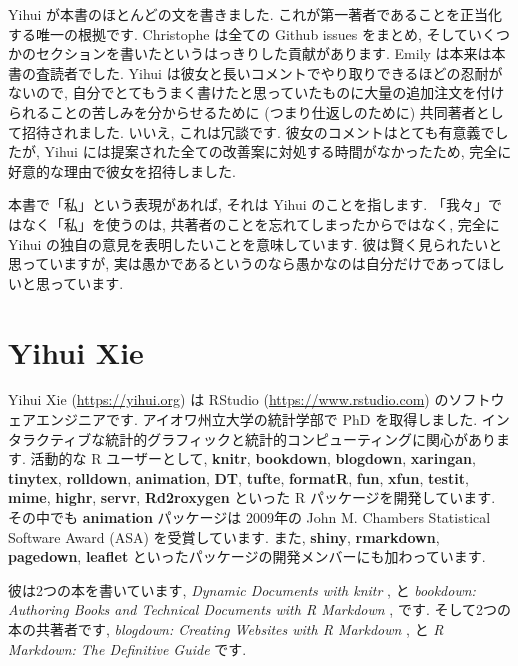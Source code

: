 \documentclass[
  11pt,
]{bxjsreport}
\begin{document}
Yihui が本書のほとんどの文を書きました. これが第一著者であることを正当化する唯一の根拠です. Christophe は全ての Github issues をまとめ, そしていくつかのセクションを書いたというはっきりした貢献があります. Emily は本来は本書の査読者でした. Yihui は彼女と長いコメントでやり取りできるほどの忍耐がないので, 自分でとてもうまく書けたと思っていたものに大量の追加注文を付けられることの苦しみを分からせるために (つまり仕返しのために) 共同著者として招待されました. いいえ, これは冗談です. 彼女のコメントはとても有意義でしたが, Yihui には提案された全ての改善案に対処する時間がなかったため, 完全に好意的な理由で彼女を招待しました.

本書で「私」という表現があれば, それは Yihui のことを指します. 「我々」ではなく「私」を使うのは, 共著者のことを忘れてしまったからではなく, 完全に Yihui の独自の意見を表明したいことを意味しています. 彼は賢く見られたいと思っていますが, 実は愚かであるというのなら愚かなのは自分だけであってほしいと思っています.

\hypertarget{yihui-xie}{%
\section*{Yihui Xie}\label{yihui-xie}}

Yihui Xie (\url{https://yihui.org}) は RStudio (\url{https://www.rstudio.com}) のソフトウェアエンジニアです. アイオワ州立大学の統計学部で PhD を取得しました. インタラクティブな統計的グラフィックと統計的コンピューティングに関心があります. 活動的な R ユーザーとして, \textbf{knitr}, \textbf{bookdown}, \textbf{blogdown}, \textbf{xaringan}, \textbf{tinytex}, \textbf{rolldown}, \textbf{animation}, \textbf{DT}, \textbf{tufte}, \textbf{formatR}, \textbf{fun}, \textbf{xfun}, \textbf{testit}, \textbf{mime}, \textbf{highr}, \textbf{servr}, \textbf{Rd2roxygen} といった R パッケージを開発しています. その中でも \textbf{animation} パッケージは 2009年の John M. Chambers Statistical Software Award (ASA) を受賞しています. また, \textbf{shiny}, \textbf{rmarkdown}, \textbf{pagedown}, \textbf{leaflet} といったパッケージの開発メンバーにも加わっています.

彼は2つの本を書いています, \emph{Dynamic Documents with knitr} \autocite{knitr2015}, と \emph{bookdown: Authoring Books and Technical Documents with R Markdown} \autocite{bookdown2016}, です. そして2つの本の共著者です, \emph{blogdown: Creating Websites with R Markdown} \autocite{blogdown2017}, と \emph{R Markdown: The Definitive Guide} \autocite{rmarkdown2018} です.
\end{document}
